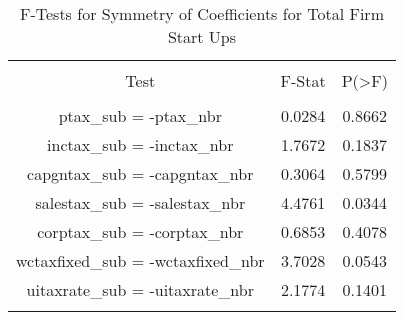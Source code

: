 
\begin{table}[!htbp] \centering 
  \caption{F-Tests for Symmetry of Coefficients for Total Firm Start Ups} 
  \label{--Ftests} 
\begin{tabular}{@{\extracolsep{5pt}} ccc} 
\\[-1.8ex]\hline 
\hline \\[-1.8ex] 
Test & F-Stat & P(\textgreater F) \\ 
\hline \\[-1.8ex] 
ptax\_sub = -ptax\_nbr & 0.0284 & 0.8662 \\ 
inctax\_sub = -inctax\_nbr & 1.7672 & 0.1837 \\ 
capgntax\_sub = -capgntax\_nbr & 0.3064 & 0.5799 \\ 
salestax\_sub = -salestax\_nbr & 4.4761 & 0.0344 \\ 
corptax\_sub = -corptax\_nbr & 0.6853 & 0.4078 \\ 
wctaxfixed\_sub = -wctaxfixed\_nbr & 3.7028 & 0.0543 \\ 
uitaxrate\_sub = -uitaxrate\_nbr & 2.1774 & 0.1401 \\ 
\hline \\[-1.8ex] 
\end{tabular} 
\end{table} 
